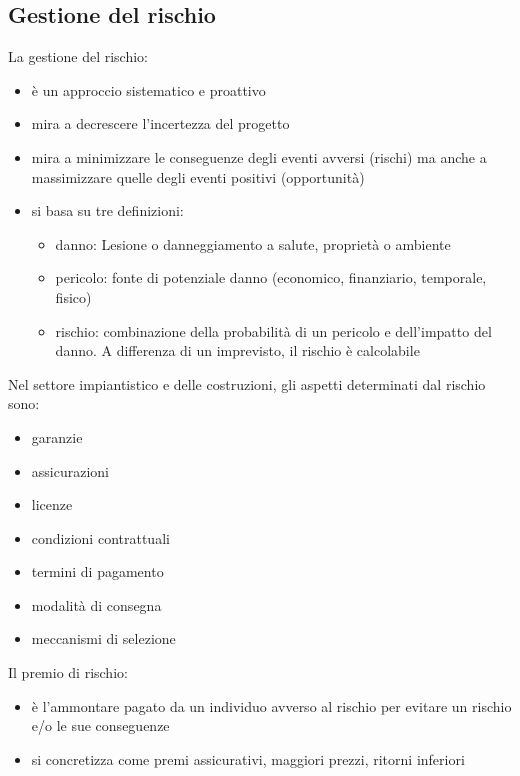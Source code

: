 \documentclass[answers, a4paper, 11pt]{exam}
\begin{document}
\subsection{Gestione del rischio}

La gestione del rischio:

\begin{itemize}
    \item è un approccio sistematico e proattivo
    \item mira a decrescere l'incertezza del progetto
    \item mira a minimizzare le conseguenze degli eventi avversi (rischi) ma anche a massimizzare quelle degli eventi positivi (opportunità)
    \item si basa su tre definizioni:
    \begin{itemize}
        \item danno: Lesione o danneggiamento a salute, proprietà o ambiente
        \item pericolo: fonte di potenziale danno (economico, finanziario, temporale, fisico)
        \item rischio: combinazione della probabilità di un pericolo e dell'impatto del danno. A differenza di un imprevisto, il rischio è calcolabile
    \end{itemize}
\end{itemize}

Nel settore impiantistico e delle costruzioni, gli aspetti determinati dal rischio sono:

\begin{itemize}
    \item garanzie
    \item assicurazioni
    \item licenze
    \item condizioni contrattuali
    \item termini di pagamento
    \item modalità di consegna
    \item meccanismi di selezione
\end{itemize}

Il premio di rischio:

\begin{itemize}
    \item è l'ammontare pagato da un individuo avverso al rischio per evitare un rischio e/o le sue conseguenze
    \item si concretizza come premi assicurativi, maggiori prezzi, ritorni inferiori
\end{itemize}
\end{document}
